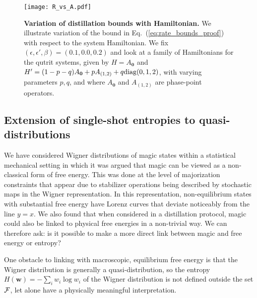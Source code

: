 \documentclass[
onecolumn,
superscriptaddress
]{revtex4-1}
\def\bmo{\boldsymbol{0}}
\def\w{\boldsymbol{w}}
\def\F{{\cal F}}
\begin{document}
\begin{figure}
    \centering
    \texttt{[image: R\_vs\_A.pdf]}
    \caption{\textbf{Variation of distillation bounds with Hamiltonian.}  We illustrate variation of the bound in Eq.~(\ref{eq:rate_bounds_proof}) with respect to the system Hamiltonian. We fix $(\epsilon, \epsilon', \beta) = (0.1, 0.0, 0.2)$ and look at a family of Hamiltonians for the qutrit systems, given by $H = A_{\bmo}$ and $H' = (1-p-q)A_{\bmo}+pA_{(1,2)}+q{\rm{diag}}(0,1,2)$, with varying parameters $p, q$, and where $A_{\bmo}$ and $A_{(1,2)}$ are phase-point operators. 
    }
    \label{fig:rvsa}
\end{figure}

\subsection*{Extension of single-shot entropies to quasi-distributions}

We have considered Wigner distributions of magic states within a statistical mechanical setting in which it was argued that magic can be viewed as a non-classical form of free energy. This was done at the level of majorization constraints that appear due to stabilizer operations being described by stochastic maps in the Wigner representation. In this representation, non-equilibrium states with substantial free energy have Lorenz curves that deviate noticeably from the line $y=x$. We also found that when considered in a distillation protocol, magic could also be linked to physical free energies in a non-trivial way. We can therefore ask: is it possible to make a more direct link between magic and free energy or entropy?

One obstacle to linking with macroscopic, equilibrium free energy is that the Wigner distribution is generally a quasi-distribution, so the entropy $H(\w) = -\sum_i w_i \log w_i$ of the Wigner distribution is not defined outside the set $\F$, let alone have a physically meaningful interpretation.
 
\end{document}
